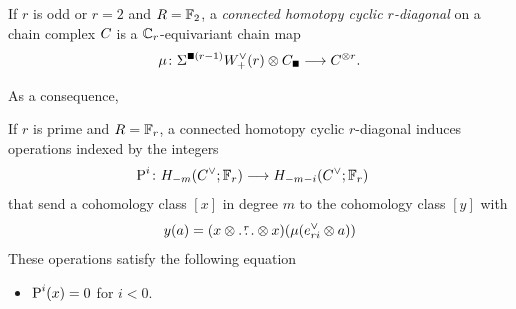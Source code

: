 \begin{definition}\label{def:connected_diagonal}
If $r$ is odd or $r=2$ and $R=\mathbb{F}_2$, a \emph{connected homotopy cyclic $r$-diagonal} on a chain complex $C_{}$ is a $\mathbb{C}_r$-equivariant chain map
	\[
	\mu \colon \susp{\bs(r-1)}\Wdualaug{r} \ot C_{\bs} \lra \ucadenas^{\ot r}.
	\]
\end{definition}




As a consequence,

\begin{proposition}
	If $r$ is prime and $R=\mathbb{F}_r$, a connected homotopy cyclic $r$-diagonal induces operations indexed by the integers
	\begin{align*}
		\operatorname{P}^{i} \colon H_{-m}(C^\vee_{};\mathbb{F}_r)& \longrightarrow H_{-m-i}(C^\vee_{};\mathbb{F}_r)
	\end{align*}
	that send a cohomology class $[x]$ in degree $m$ to the cohomology class $[y]$ with
	\[
	y(a) = (x \otimes \overset{r}{\dots} \otimes x)(\mu(e_{ri}^\vee \otimes a))
	\]
	These operations satisfy the following equation
	\begin{itemize}
		\item $\operatorname{P}^i(x) = 0$ for $i<0$.
	\end{itemize}
\end{proposition}

